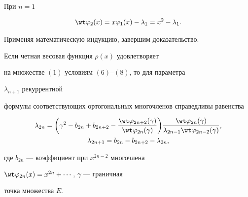  


\begin{pf} 


При $n=1$ 


$$ 


\wt\varphi_2(x)=x\varphi_1(x)-\lambda_1=x^2-\lambda_1. 


$$ 


Применяя математическую индукцию, завершим доказательство. 


\end{pf} 


 


\begin{thm} 


Если четная весовая функция $\rho(x)$ удовлетворяет 


на множестве $(1)$ условиям $(6)$--$(8)$, то для параметра 


$\lambda_{n+1}$ рекуррентной 


формулы соответствующих ортогональных многочленов справедливы равенства 


\begin{gather} 


\lambda_{2n}=\bigg(\gamma^2-b_{2n}+b_{2n+2}- 


\frac{\wt\varphi_{2n+2}(\gamma)}{\wt\varphi_{2n}(\gamma)} \bigg) 


\frac{\wt\varphi_{2n}(\gamma)} 


{\lambda_{2n-1}\wt\varphi_{2n-2}(\gamma)},\\ 


% 


\lambda_{2n+1}=b_{2n}-b_{2n+2}-\lambda_{2n},\notag 


\end{gather} 


где $b_{2n}$ --- коэффициент при $x^{2n-2}$ многочлена 


$\wt\varphi_{2n}(x)=x^{2n}+\dotsb$, $\gamma$ --- граничная 


точка множества $E$. 


\end{thm} 


 


